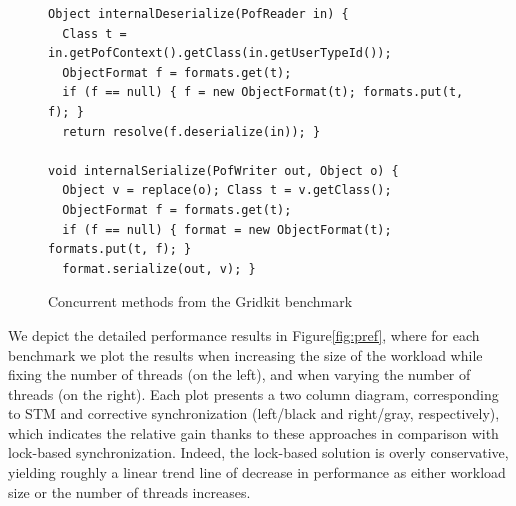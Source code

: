 \begin{figure}[tb]
%
\begin{lstlisting}
Object internalDeserialize(PofReader in) {
  Class t = in.getPofContext().getClass(in.getUserTypeId());
  ObjectFormat f = formats.get(t);
  if (f == null) { f = new ObjectFormat(t); formats.put(t, f); }
  return resolve(f.deserialize(in)); }

void internalSerialize(PofWriter out, Object o) {
  Object v = replace(o); Class t = v.getClass();
  ObjectFormat f = formats.get(t);
  if (f == null) { format = new ObjectFormat(t); formats.put(t, f); }
  format.serialize(out, v); }
\end{lstlisting}
	\caption{\label{Fi:gridkitPair}Concurrent methods from the Gridkit benchmark}
\end{figure}




%
We depict the detailed performance results in Figure\ref{fig:pref}, where for each benchmark we plot the results when increasing the size of the workload while fixing the number of threads (on the left), and when varying the number of threads (on the right).
Each plot presents a two column diagram, corresponding to STM and corrective synchronization (left/black and right/gray, respectively), which indicates the relative gain thanks to these approaches in comparison with lock-based synchronization. Indeed, the lock-based solution is overly conservative, yielding roughly a linear trend line of decrease in performance as either workload size or the number of threads increases.

